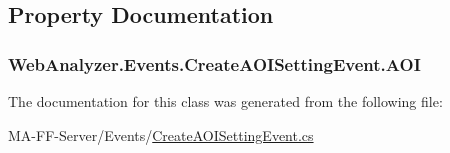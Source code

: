 \subsection{Property Documentation}
\hypertarget{class_web_analyzer_1_1_events_1_1_create_a_o_i_setting_event_a9fd4a39178dd304567bc8439d90a4b32}{}
\subsubsection[{A\+O\+I}]{ Web\+Analyzer.\+Events.\+Create\+A\+O\+I\+Setting\+Event.\+A\+O\+I\hspace{0.3cm}{\ttfamily [get]}}\label{class_web_analyzer_1_1_events_1_1_create_a_o_i_setting_event_a9fd4a39178dd304567bc8439d90a4b32}


The documentation for this class was generated from the following file\+:\begin{DoxyCompactItemize}
\item 
M\+A-\/\+F\+F-\/\+Server/\+Events/\hyperlink{_create_a_o_i_setting_event_8cs}{Create\+A\+O\+I\+Setting\+Event.\+cs}\end{DoxyCompactItemize}
